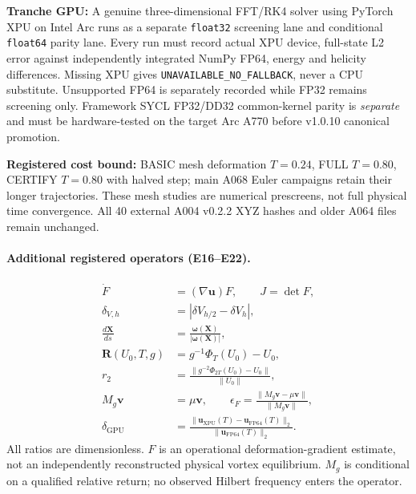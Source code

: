 \documentclass[11pt,a4paper]{article}
\begin{document}
\textbf{Tranche GPU:} A genuine three-dimensional FFT/RK4 solver using PyTorch XPU on Intel Arc runs as a separate \texttt{float32} screening lane and conditional \texttt{float64} parity lane. Every run must record actual XPU device, full-state L2 error against independently integrated NumPy FP64, energy and helicity differences. Missing XPU gives \texttt{UNAVAILABLE\_NO\_FALLBACK}, never a CPU substitute. Unsupported FP64 is separately recorded while FP32 remains screening only. Framework SYCL FP32/DD32 common-kernel parity is \emph{separate} and must be hardware-tested on the target Arc A770 before v1.0.10 canonical promotion.\par
\textbf{Registered cost bound:} BASIC mesh deformation $T=0.24$, FULL $T=0.80$, CERTIFY $T=0.80$ with halved step; main A068 Euler campaigns retain their longer trajectories. These mesh studies are numerical prescreens, not full physical time convergence. All 40 external A004 v0.2.2 XYZ hashes and older A064 files remain unchanged.\par

\paragraph{Additional registered operators (E16--E22).}
\begin{align}
\dot F&=(\nabla\mathbf u)F,\qquad J=\det F,\\
\delta_{V,h}&=|\delta V_{h/2}-\delta V_h|,\\
\frac{d\mathbf X}{ds}&=\frac{\boldsymbol\omega(\mathbf X)}{|\boldsymbol\omega(\mathbf X)|},\\
\mathbf R(U_0,T,g)&=g^{-1}\Phi_T(U_0)-U_0,\\
 r_2&=\frac{\|g^{-2}\Phi_{2T}(U_0)-U_0\|}{\|U_0\|},\\
 M_g\mathbf v&=\mu\mathbf v,\qquad
\epsilon_F=\frac{\|M_g\mathbf v-\mu\mathbf v\|}{\|M_g\mathbf v\|},\\
\delta_{\mathrm{GPU}}&=\frac{\|\mathbf u_{\mathrm{XPU}}(T)-\mathbf u_{\mathrm{FP64}}(T)\|_2}{\|\mathbf u_{\mathrm{FP64}}(T)\|_2}.
\end{align}
All ratios are dimensionless. $F$ is an operational deformation-gradient estimate,
not an independently reconstructed physical vortex equilibrium. $M_g$ is conditional
on a qualified relative return; no observed Hilbert frequency enters the operator.
\end{document}
